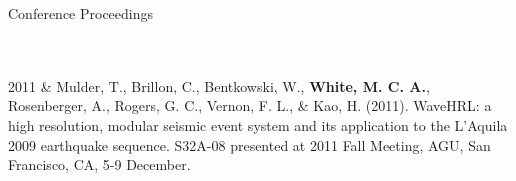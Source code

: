 \begin{rSection}{Conference Proceedings}
\begin{timeline}
			\\
			\\
		2011
			& Mulder, T., Brillon, C., Bentkowski, W., \textbf{White, M. C. A.}, Rosenberger, A., Rogers, G. C., Vernon, F. L., \& Kao, H. (2011). WaveHRL: a high resolution, modular seismic event system and its application to the L'Aquila 2009 earthquake sequence. S32A-08 presented at 2011 Fall Meeting, AGU, San Francisco, CA, 5-9 December.
	\end{timeline}
\end{rSection}